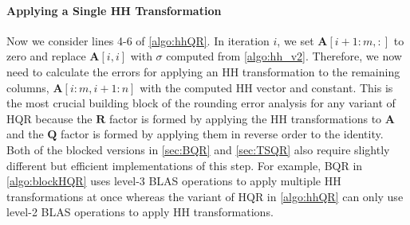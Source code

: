 \documentclass[review,onefignum,onetabnum]{siamart190516}
\newcommand{\bb}[1]{\mathbf{#1}}
\begin{document}
\paragraph{Applying a Single HH Transformation}
Now we consider lines 4-6 of \cref{algo:hhQR}.
In iteration $i$, we set $\bb{A}[i+1:m,:]$ to zero and replace $\bb{A}[i,i]$ with $\sigma$ computed from \cref{algo:hh_v2}.
Therefore, we now need to calculate the errors for applying an HH transformation to the remaining columns, $\bb{A}[i:m, i+1:n]$ with the computed HH vector and constant.
This is the most crucial building block of the rounding error analysis for any variant of HQR because the $\bb{R}$ factor is formed by applying the HH transformations to $\bb{A}$ and the $\bb{Q}$ factor is formed by applying them in reverse order to the identity.
Both of the blocked versions in \cref{sec:BQR} and \cref{sec:TSQR} also require slightly different but efficient implementations of this step.
For example, BQR in \cref{algo:blockHQR} uses level-3 BLAS operations to apply multiple HH transformations at once whereas the variant of HQR in \cref{algo:hhQR} can only use level-2 BLAS operations to apply HH transformations.\par
\end{document}
